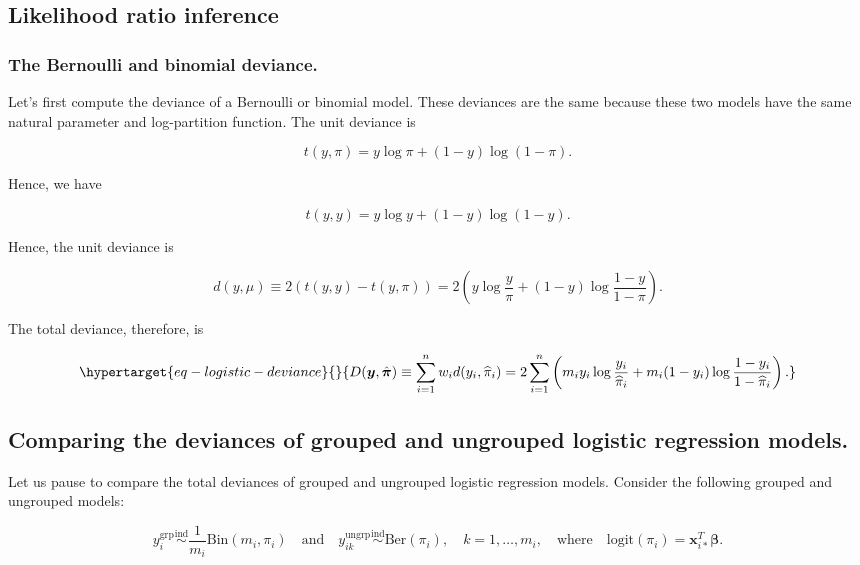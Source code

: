 \documentclass[
  11pt,
  letterpaper,
  oneside]{book}
\theoremstyle{plain}
\theoremstyle{plain}
\theoremstyle{definition}
\theoremstyle{definition}
\theoremstyle{plain}
\theoremstyle{remark}
\begin{document}
\hypertarget{sec-likelihood-ratio-inference}{%
\subsection{Likelihood ratio
inference}\label{sec-likelihood-ratio-inference}}

\hypertarget{sec-bernoulli-binomial-deviance}{%
\subsubsection{The Bernoulli and binomial
deviance.}\label{sec-bernoulli-binomial-deviance}}

Let's first compute the deviance of a Bernoulli or binomial model. These
deviances are the same because these two models have the same natural
parameter and log-partition function. The unit deviance is

\[
t(y, \pi) = y \log \pi + (1-y)\log(1-\pi).
\]

Hence, we have

\[
t(y, y) = y \log y + (1-y) \log(1-y).
\]

Hence, the unit deviance is

\[
d(y, \mu) \equiv 2(t(y,y)-t(y,\pi)) = 2\left(y \log \frac{y}{\pi} + (1-y)\log \frac{1-y}{1-\pi}\right).
\]

The total deviance, therefore, is

\begin{equation}\protect\hypertarget{eq-logistic-deviance}{}{
D(\boldsymbol y, \hat{\boldsymbol \pi}) \equiv \sum_{i = 1}^n w_i d(y_i, \widehat \pi_i) = 2\sum_{i = 1}^n \left(m_i y_i \log \frac{y_i}{\widehat \pi_i} + m_i(1-y_i) \log\frac{1-y_i}{1-\widehat \pi_i}\right).
}\label{eq-logistic-deviance}\end{equation}

\hypertarget{sec-comparing-deviances}{%
\subsection{Comparing the deviances of grouped and ungrouped logistic
regression models.}\label{sec-comparing-deviances}}

Let us pause to compare the total deviances of grouped and ungrouped
logistic regression models. Consider the following grouped and ungrouped
models:

\[
y^{\text{grp}}_i \overset{\text{ind}} \sim \frac{1}{m_i}\text{Bin}(m_i, \pi_i) \quad \text{and} \quad y^{\text{ungrp}}_{ik} \overset{\text{ind}} \sim \text{Ber}(\pi_i), \quad k = 1, \dots, m_i, \quad \text{where} \quad \text{logit}(\pi_i) = \boldsymbol x_{i*}^T \boldsymbol \beta.
\]
\end{document}
